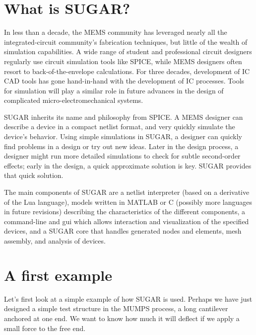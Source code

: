 
\section{What is SUGAR?}

In less than a decade, the MEMS community has leveraged nearly all the
integrated-circuit community's fabrication techniques, but little of the wealth
of simulation capabilities.  A wide range of student and professional circuit
designers regularly use circuit simulation tools like SPICE, while MEMS
designers often resort to back-of-the-envelope calculations.  
For three decades, development of IC CAD tools has gone hand-in-hand
with the development of IC processes.  Tools for simulation will
play a similar role in future advances in the design of complicated
micro-electromechanical systems.

SUGAR inherits its name and philosophy from SPICE.  A MEMS designer can
describe a device in a compact netlist format, and very quickly simulate
the device's behavior.  Using simple simulations in SUGAR, a designer can
quickly find problems in a design or try out new ideas.
Later in the design process, a designer might run more detailed simulations
to check for subtle second-order effects; early in the design, a quick
approximate solution is key.  SUGAR provides that quick solution.

The main components of SUGAR are a netlist interpreter (based on a derivative 
of the Lua language), models written in MATLAB or C (possibly 
more languages in future revisions) describing the characteristics of the 
different components, a command-line and gui which allows interaction and 
visualization of the specified devices, and a SUGAR core that handles 
generated nodes and elements, mesh assembly, and analysis of devices.

\section{A first example}

Let's first look at a simple example of how SUGAR is used.
Perhaps we have just designed a simple test structure in the MUMPS process,
a long cantilever anchored at one end.  We want to know how much
it will deflect if we apply a small force to the free end.

